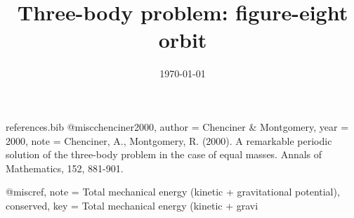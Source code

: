 \begin{filecontents*}[overwrite]{references.bib}
@misc{chenciner2000,
  author = {Chenciner \& Montgomery},
  year   = {2000},
  note   = {Chenciner, A., Montgomery, R. (2000). A remarkable periodic solution of the three-body problem in the case of equal masses. Annals of Mathematics, 152, 881-901.}
}

@misc{ref,
  note   = {Total mechanical energy (kinetic + gravitational potential), conserved},
  key    = {Total mechanical energy (kinetic + gravi}
}
\end{filecontents*}
\documentclass[11pt,a4paper]{article}
\usepackage[T1]{fontenc}
\usepackage[utf8]{inputenc}
\usepackage{lmodern}
\usepackage{amsmath,amssymb}
\usepackage{booktabs,longtable}
\usepackage{siunitx}
\usepackage{algorithm}
\usepackage{algpseudocode}
\usepackage{tikz}
\usetikzlibrary{positioning,shapes.geometric,shapes.misc,arrows.meta}
\usepackage{adjustbox}
\usepackage[hidelinks]{hyperref}

\title{Three-body problem: figure-eight orbit}
\author{}
\date{\today}


\maketitle

The model consists of 7 equations in 12 variables: 5 inputs, 6 state variables, 0 intermediate variables and 1 output. It is solved in 2 steps (Algorithm~\ref{alg:solution}).

